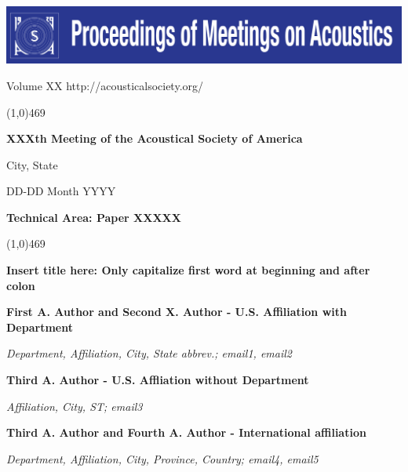\documentclass[11pt]{article}
\def\ASAline{

    \vspace{-0.9em}
    \noindent \color{ASAblue}\linethickness{.8mm}\line(1,0){469}\hspace{\fill}
    \color{black}
    \vspace{-0.9em}

}
\begin{document}
\sloppy


\noindent\includegraphics[height=.95in]{POMA_masthead2}

\noindent \large{Volume XX \hfill http://acousticalsociety.org/}

\ASAline

\vspace{-12pt}

\begin{center}

\LARGE{\bf XXXth Meeting of the Acoustical Society of America}  

\large{City, State}

{DD-DD Month YYYY}

\LARGE{\bf Technical Area: Paper XXXXX}

\end{center}

\vspace{-5pt}

\ASAline

\vspace{-15pt}
\begin{flushleft}

\huge{ \bf Insert title here: Only capitalize first word at beginning and after colon}



\large{\bf First A. Author and Second X. Author - U.S. Affiliation with Department}\par
\normalsize{\it \vspace{-7pt} Department, Affiliation, City, State abbrev.; email1, email2}

\large{\bf Third A. Author - U.S. Affliation without Department}\par
\normalsize{\it \vspace{-7pt} Affiliation, City, ST; email3}

\large{\bf Third A. Author and Fourth A. Author - International affiliation}\par
\normalsize{\it \vspace{-7pt} Department, Affiliation, City, Province, Country; email4, email5 }


\end{flushleft}
\end{document}
